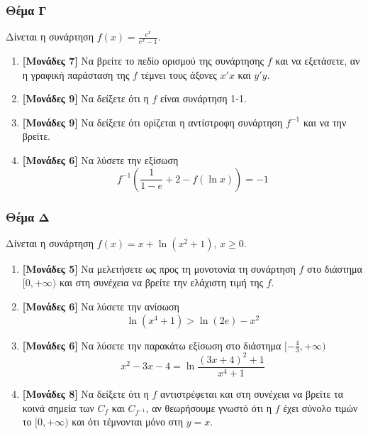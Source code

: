 \documentclass[12pt]{article}
\begin{document}
\section*{Θέμα Γ}
  \noindent
  Δίνεται η συνάρτηση $f(x)=\frac{e^x}{e^x-1}$.
  \begin{enumerate}
    \item \textbf{[Μονάδες 7]} Να βρείτε το πεδίο ορισμού της συνάρτησης $f$ και να εξετάσετε, αν η γραφική παράσταση της $f$ τέμνει τους άξονες $x'x$ και $y'y$.
    \item \textbf{[Μονάδες 9]} Να δείξετε ότι η $f$ είναι συνάρτηση 1-1.
    \item \textbf{[Μονάδες 9]} Να δείξετε ότι ορίζεται η αντίστροφη συνάρτηση $f^{-1}$ και να την βρείτε.
    \item \textbf{[Μονάδες 6]} Να λύσετε την εξίσωση
    $$f^{-1}\left(\frac{1}{1-e}+2-f(\ln x)\right)=-1$$
  \end{enumerate}

  \section*{Θέμα Δ}
    \noindent
    Δίνεται η συνάρτηση $f(x)=x+\ln(x^2+1)$, $x\ge 0$.
    \begin{enumerate}
      \item \textbf{[Μονάδες 5]} Να μελετήσετε ως προς τη μονοτονία τη συνάρτηση $f$ στο διάστημα $[0,+\infty)$ και στη συνέχεια να βρείτε την ελάχιστη τιμή της $f$.
      \item \textbf{[Μονάδες 6]} Να λύσετε την ανίσωση
      $$\ln (x^4+1)>\ln (2e)-x^2$$
      \item \textbf{[Μονάδες 6]} Να λύσετε την παρακάτω εξίσωση στο διάστημα $[-\frac{4}{3},+\infty)$
$$x^2-3x-4=\ln \frac{(3x+4)^2+1}{x^4+1}$$
      \item \textbf{[Μονάδες 8]} Να δείξετε ότι η $f$ αντιστρέφεται και στη συνέχεια να βρείτε τα κοινά σημεία των $C_f$ και $C_{f^{-1}}$, αν θεωρήσουμε γνωστό ότι η $f$ έχει σύνολο τιμών το $[0,+\infty)$ και ότι τέμνονται μόνο στη $y=x$.
    \end{enumerate}

\vspace{2\baselineskip}

\part*{}
\end{document}

